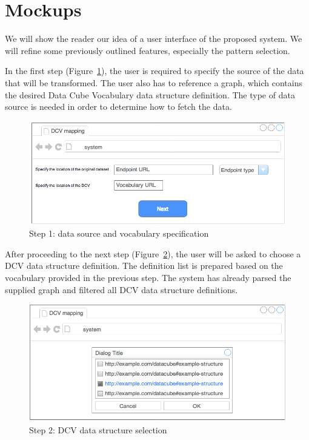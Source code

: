 \section{Mockups}
\FloatBarrier
We will show the reader our idea of a user interface of the proposed system. We 
will refine some previously outlined features, especially the pattern selection.

In the first step (Figure~\ref{fig:mockup-01}), the user is required to specify the source of the data that 
will be transformed. The user also has to reference a graph, which contains the 
desired Data Cube Vocabulary data structure definition. The type of data source 
is needed in order to determine how to fetch the data.
\begin{figure}
	\centering
	\includegraphics[width=120mm]{img/mockup-01.png}
	\caption{Step 1: data source and vocabulary specification}
	\label{fig:mockup-01}
\end{figure}

After proceeding to the next step (Figure~\ref{fig:mockup-02}),
the user will be asked to choose a DCV data 
structure definition. The definition list is prepared based on the vocabulary provided 
in the previous step. The system has already parsed the supplied graph and filtered all
DCV data structure definitions. 

\begin{figure}
	\centering
	\includegraphics[width=120mm]{img/mockup-02.png}
	\caption{Step 2: DCV data structure selection}
	\label{fig:mockup-02}
\end{figure}

